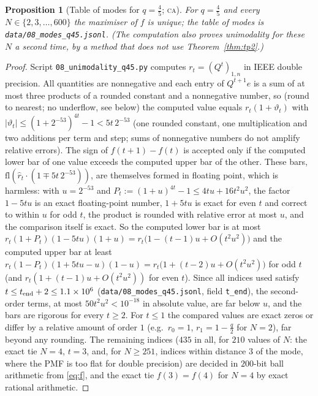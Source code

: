 \documentclass[11pt,a4paper]{article}
\newtheorem{proposition}[theorem]{Proposition}
\theoremstyle{definition}
\theoremstyle{remark}
\newcommand{\CA}{\textsc{ca}}
\begin{document}
\begin{proposition}[Table of modes for $q=\frac45$; \CA]\label{prop:ca45}
For $q=\frac45$ and every $N\in\{2,3,\dots,600\}$ the maximiser of $f$ is unique; the table of modes is
\texttt{data/08\_modes\_q45.jsonl}. (The computation also proves unimodality for these $N$ a second time, by a
method that does not use Theorem~\ref{thm:tp2}.)
\end{proposition}
\begin{proof}
Script \texttt{08\_unimodality\_q45.py} computes
$r_t=(Q^t)_{1,n}$ in IEEE double precision. All quantities are nonnegative and each entry of $Q^{t+1}e$ is a sum
of at most three products of a rounded constant and a nonnegative number, so (round to nearest; no underflow, see
below) the computed value equals
$r_t(1+\vartheta_t)$ with $|\vartheta_t|\le(1+2^{-53})^{4t}-1<5t\,2^{-53}$ (one rounded constant, one multiplication and
two additions per term and step; sums of nonnegative numbers do not amplify relative errors). The sign of $f(t+1)-f(t)$
is accepted only if the computed lower bar of one value exceeds the computed upper bar of the other. These bars,
$\mathrm{fl}(\hat r_t\cdot(1\mp5t\,2^{-53}))$, are themselves formed in floating point, which is harmless: with
$u=2^{-53}$ and $P_t:=(1+u)^{4t}-1\le4tu+16t^2u^2$, the factor $1-5tu$ is an exact floating-point number, $1+5tu$ is exact
for even $t$ and correct to within $u$ for odd $t$, the product is rounded with relative error at most $u$, and the
comparison itself is exact. So the computed lower bar is at most $r_t(1+P_t)(1-5tu)(1+u)=r_t\bigl(1-(t-1)u+O(t^2u^2)\bigr)$
and the computed upper bar at least $r_t(1-P_t)(1+5tu-u)(1-u)=r_t\bigl(1+(t-2)u+O(t^2u^2)\bigr)$ for odd $t$
(and $r_t(1+(t-1)u+O(t^2u^2))$ for even $t$). Since all indices used satisfy $t\le t_{\rm end}+2\le1.1\times10^6$
(\texttt{data/08\_modes\_q45.jsonl}, field \texttt{t\_end}), the second-order terms, at most $50t^2u^2<10^{-18}$ in absolute value, are far below $u$,
and the bars are rigorous for every $t\ge2$. For $t\le1$ the compared values are exact zeros or differ by a relative
amount of order $1$ (e.g.\ $r_0=1$, $r_1=1-\frac q2$ for $N=2$), far beyond any rounding. %
The remaining indices ($435$ in all, for $210$ values of
$N$: the exact tie $N=4$, $t=3$, and, for $N\ge251$, indices within distance $3$ of the mode, where the PMF is too flat
for double precision) are decided in $200$-bit ball arithmetic from \eqref{eq:f}, and the exact tie $f(3)=f(4)$ for $N=4$
by exact rational arithmetic.


\end{proof}
\end{document}
